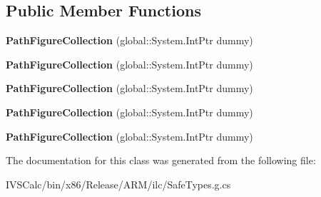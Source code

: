 \subsection*{Public Member Functions}
\begin{DoxyCompactItemize}
\item 
\mbox{\label{class_windows_1_1_u_i_1_1_xaml_1_1_media_1_1_path_figure_collection_a39b3f654dad9a0e095fd717624dcfd6f}} 
{\bfseries Path\+Figure\+Collection} (global\+::\+System.\+Int\+Ptr dummy)
\item 
\mbox{\label{class_windows_1_1_u_i_1_1_xaml_1_1_media_1_1_path_figure_collection_a39b3f654dad9a0e095fd717624dcfd6f}} 
{\bfseries Path\+Figure\+Collection} (global\+::\+System.\+Int\+Ptr dummy)
\item 
\mbox{\label{class_windows_1_1_u_i_1_1_xaml_1_1_media_1_1_path_figure_collection_a39b3f654dad9a0e095fd717624dcfd6f}} 
{\bfseries Path\+Figure\+Collection} (global\+::\+System.\+Int\+Ptr dummy)
\item 
\mbox{\label{class_windows_1_1_u_i_1_1_xaml_1_1_media_1_1_path_figure_collection_a39b3f654dad9a0e095fd717624dcfd6f}} 
{\bfseries Path\+Figure\+Collection} (global\+::\+System.\+Int\+Ptr dummy)
\item 
\mbox{\label{class_windows_1_1_u_i_1_1_xaml_1_1_media_1_1_path_figure_collection_a39b3f654dad9a0e095fd717624dcfd6f}} 
{\bfseries Path\+Figure\+Collection} (global\+::\+System.\+Int\+Ptr dummy)
\end{DoxyCompactItemize}


The documentation for this class was generated from the following file\+:\begin{DoxyCompactItemize}
\item 
I\+V\+S\+Calc/bin/x86/\+Release/\+A\+R\+M/ilc/Safe\+Types.\+g.\+cs\end{DoxyCompactItemize}
